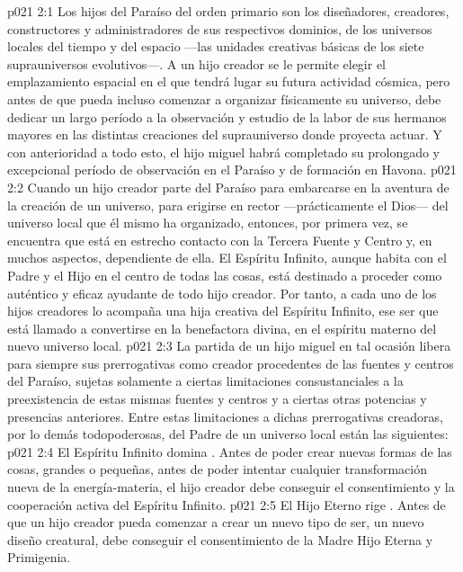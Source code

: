 \vs p021 2:1 Los hijos del Paraíso del orden primario son los diseñadores, creadores, constructores y administradores de sus respectivos dominios, de los universos locales del tiempo y del espacio ---las unidades creativas básicas de los siete suprauniversos evolutivos---. A un hijo creador se le permite elegir el emplazamiento espacial en el que tendrá lugar su futura actividad cósmica, pero antes de que pueda incluso comenzar a organizar físicamente su universo, debe dedicar un largo período a la observación y estudio de la labor de sus hermanos mayores en las distintas creaciones del suprauniverso donde proyecta actuar. Y con anterioridad a todo esto, el hijo miguel habrá completado su prolongado y excepcional período de observación en el Paraíso y de formación en Havona.
\vs p021 2:2 \pc Cuando un hijo creador parte del Paraíso para embarcarse en la aventura de la creación de un universo, para erigirse en rector ---prácticamente el Dios--- del universo local que él mismo ha organizado, entonces, por primera vez, se encuentra que está en estrecho contacto con la Tercera Fuente y Centro y, en muchos aspectos, dependiente de ella. El Espíritu Infinito, aunque habita con el Padre y el Hijo en el centro de todas las cosas, está destinado a proceder como auténtico y eficaz ayudante de todo hijo creador. Por tanto, a cada uno de los hijos creadores lo acompaña una hija creativa del Espíritu Infinito, ese ser que está llamado a convertirse en la benefactora divina, en el espíritu materno del nuevo universo local.
\vs p021 2:3 La partida de un hijo miguel en tal ocasión libera para siempre sus prerrogativas como creador procedentes de las fuentes y centros del Paraíso, sujetas solamente a ciertas limitaciones consustanciales a la preexistencia de estas mismas fuentes y centros y a ciertas otras potencias y presencias anteriores. Entre estas limitaciones a dichas prerrogativas creadoras, por lo demás todopoderosas, del Padre de un universo local están las siguientes:
\vs p021 2:4 El Espíritu Infinito domina . Antes de poder crear nuevas formas de las cosas, grandes o pequeñas, antes de poder intentar cualquier transformación nueva de la energía\hyp{}materia, el hijo creador debe conseguir el consentimiento y la cooperación activa del Espíritu Infinito.
\vs p021 2:5 El Hijo Eterno rige . Antes de que un hijo creador pueda comenzar a crear un nuevo tipo de ser, un nuevo diseño creatural, debe conseguir el consentimiento de la Madre Hijo Eterna y Primigenia.
